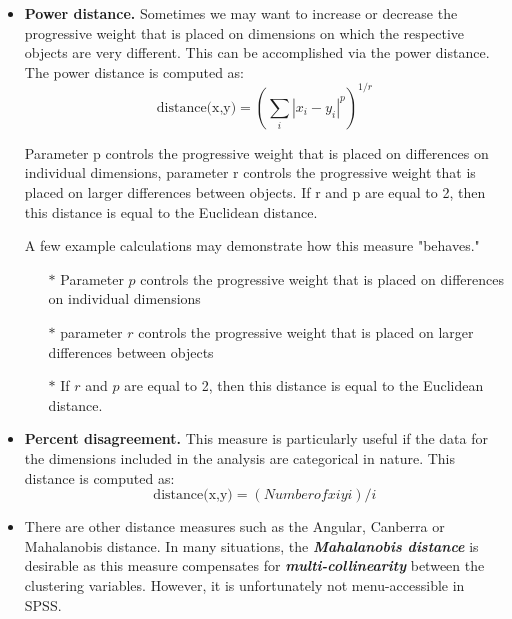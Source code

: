 \documentclass[a4paper,12pt]{report}
\begin{document}
\begin{itemize}
\begin{itemize}
\item \textbf{Power distance.} Sometimes we may want to increase or decrease the progressive weight that is placed on dimensions on which the respective objects are very different. This can be accomplished via the power distance. The power distance is computed as:
\[\mbox{distance(x,y)}  = (\sum_i |x_i - y_i|^p)^{1/r}\]

Parameter p controls the progressive weight that is placed on differences on individual dimensions, parameter r controls the progressive weight that is placed on larger differences between objects. If r and p are equal to 2, then this distance is equal to the Euclidean distance.

A few example calculations may demonstrate how this measure "behaves." 
\begin{itemize}
\item[$\ast$] Parameter $p$ controls the progressive weight that is placed on differences on individual dimensions
\item[$\ast$] parameter $r$ controls the progressive weight that is placed on larger differences between objects
\item[$\ast$] If $r$ and $p$ are equal to 2, then this distance is equal to the Euclidean distance.
\end{itemize}

\item \textbf{Percent disagreement.} This measure is particularly useful if the data for the dimensions included in the analysis are categorical in nature. This distance is computed as:
\[ \mbox{distance(x,y)} = (Number of xi  yi)/ i\]
	\item There are other distance measures such as the Angular, Canberra or Mahalanobis
	distance. In many situations, the \textbf{\textit{Mahalanobis
			distance}} is desirable as this measure compensates for \textbf{\textit{multi-collinearity}}
	between the clustering variables. However, it is unfortunately not menu-accessible
	in SPSS.
\end{itemize}
\newpage

\end{itemize}
\end{document}
